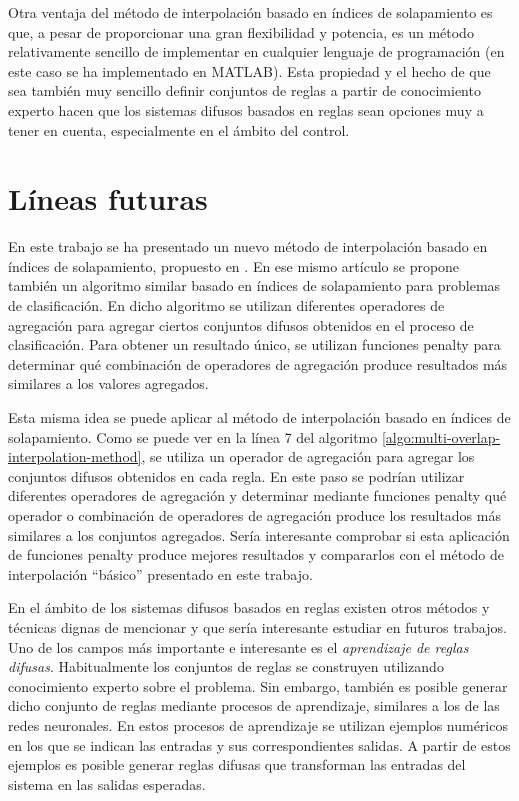 Otra ventaja del método de interpolación basado en índices de solapamiento es que, a pesar de proporcionar una gran flexibilidad y potencia, es un método relativamente sencillo de implementar en cualquier lenguaje de programación (en este caso se ha implementado en MATLAB). Esta propiedad y el hecho de que sea también muy sencillo definir conjuntos de reglas a partir de conocimiento experto hacen que los sistemas difusos basados en reglas sean opciones muy a tener en cuenta, especialmente en el ámbito del control.

\chapter{Líneas futuras}
En este trabajo se ha presentado un nuevo método de interpolación basado en índices de solapamiento, propuesto en \cite{bustince2013overlap}. En ese mismo artículo se propone también un algoritmo similar basado en índices de solapamiento para problemas de clasificación. En dicho algoritmo se utilizan diferentes operadores de agregación para agregar ciertos conjuntos difusos obtenidos en el proceso de clasificación. Para obtener un resultado único, se utilizan funciones penalty \cite{Bustince2014} para determinar qué combinación de operadores de agregación produce resultados más similares a los valores agregados.

Esta misma idea se puede aplicar al método de interpolación basado en índices de solapamiento. Como se puede ver en la línea 7 del algoritmo \ref{algo:multi-overlap-interpolation-method},  se utiliza un operador de agregación para agregar los conjuntos difusos obtenidos en cada regla. En este paso se podrían utilizar diferentes operadores de agregación y determinar mediante funciones penalty qué operador o combinación de operadores de agregación produce los resultados más similares a los conjuntos agregados. Sería interesante comprobar si esta aplicación de funciones penalty produce mejores resultados y compararlos con el método de interpolación ``básico'' presentado en este trabajo.

En el ámbito de los sistemas difusos basados en reglas existen otros métodos y técnicas dignas de mencionar y que sería interesante estudiar en futuros trabajos. Uno de los campos más importante e interesante es el \emph{aprendizaje de reglas difusas}. Habitualmente los conjuntos de reglas se construyen utilizando conocimiento experto sobre el problema. Sin embargo, también es posible generar dicho conjunto de reglas mediante procesos de aprendizaje, similares a los de las redes neuronales. En estos procesos de aprendizaje se utilizan ejemplos numéricos en los que se indican las entradas y sus correspondientes salidas. A partir de estos ejemplos es posible generar reglas difusas que transforman las entradas del sistema en las salidas esperadas.

